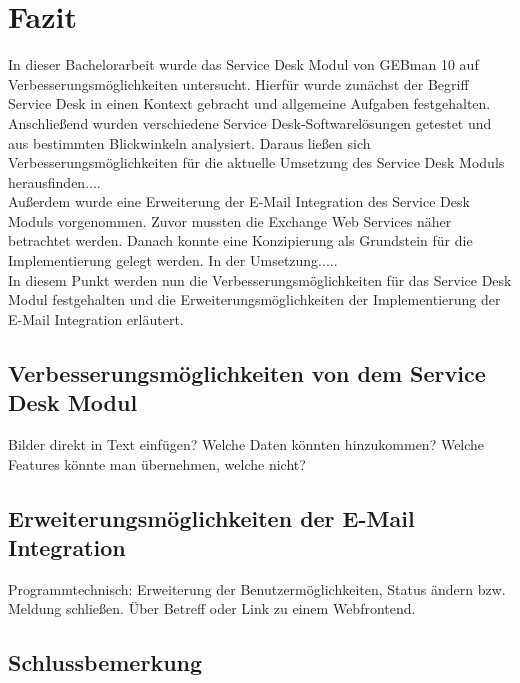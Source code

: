 \section{Fazit}

\noindent
In dieser Bachelorarbeit wurde das Service Desk Modul von GEBman 10 auf Verbesserungsmöglichkeiten untersucht. Hierfür wurde zunächst der Begriff Service Desk in einen Kontext gebracht und allgemeine Aufgaben festgehalten. Anschließend wurden verschiedene Service Desk-Softwarelösungen getestet und aus bestimmten Blickwinkeln analysiert. Daraus ließen sich Verbesserungsmöglichkeiten für die aktuelle Umsetzung des Service Desk Moduls herausfinden....\\ 

\noindent
Außerdem wurde eine Erweiterung der E-Mail Integration des Service Desk Moduls vorgenommen. Zuvor mussten die Exchange Web Services näher betrachtet werden. Danach konnte eine Konzipierung als Grundstein für die Implementierung gelegt werden. In der Umsetzung.....\\

\noindent
In diesem Punkt werden nun die Verbesserungsmöglichkeiten für das Service Desk Modul festgehalten und die Erweiterungsmöglichkeiten der Implementierung der E-Mail Integration erläutert. 



\subsection{Verbesserungsmöglichkeiten von dem Service Desk Modul}
\noindent
Bilder direkt in Text einfügen?
Welche Daten könnten hinzukommen?
Welche Features könnte man übernehmen, welche nicht?


\subsection{Erweiterungsmöglichkeiten der E-Mail Integration}
\noindent
Programmtechnisch:
Erweiterung der Benutzermöglichkeiten, Status ändern bzw. Meldung schließen. Über Betreff oder Link zu einem Webfrontend.


\subsection{Schlussbemerkung}